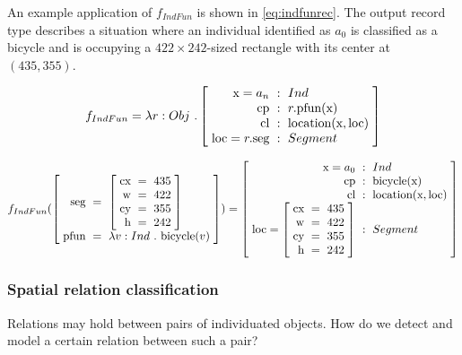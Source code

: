 
An example application of $f_{IndFun}$ is shown in \autoref{eq:indfunrec}.
The output record type describes a situation where an individual identified as $a_0$ is classified as a bicycle and is occupying a $422 \times 242$-sized rectangle with its center at $(435, 355)$.

\begin{equation}\label{eq:indfundef}
f_{IndFun} = \lambda r : Obj\ . \rec{
    \text{x} = a_n &:& Ind \\
    \text{cp} &:& r.\text{pfun}(\text{x}) \\
    \text{cl} &:& \text{location}(\text{x}, \text{loc}) \\
    \text{loc} = r.\text{seg} &:& Segment\\
}
\end{equation}

\begin{equation}\label{eq:indfunrec}
f_{IndFun}(
\rec{
\text{seg} &=& \rec{
\text{cx} &=& 435\\
\text{w} &=& 422\\
\text{cy} &=& 355\\
\text{h} &=& 242
}\\
\text{pfun} &=& \lambda v:Ind\ .\ \text{bicycle}(v)\\
}
) =
\rec{
    \text{x} = a_0 &:& Ind \\
    \text{cp} &:& \text{bicycle}(\text{x}) \\
    \text{cl} &:& \text{location}(\text{x}, \text{loc}) \\
    \text{loc} = \rec{
        \text{cx} &=& 435\\
        \text{w} &=& 422\\
        \text{cy} &=& 355\\
        \text{h} &=& 242
		} &:& Segment\\
}
\end{equation}



\subsubsection{Spatial relation classification}

Relations may hold between pairs of individuated objects.
How do we detect and model a certain relation between such a pair?

